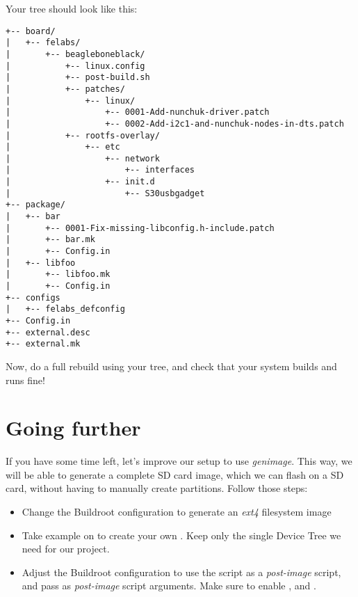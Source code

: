 Your  tree should look like this:

\begin{verbatim}
+-- board/
|   +-- felabs/
|       +-- beagleboneblack/
|           +-- linux.config
|           +-- post-build.sh
|           +-- patches/
|               +-- linux/
|                   +-- 0001-Add-nunchuk-driver.patch
|                   +-- 0002-Add-i2c1-and-nunchuk-nodes-in-dts.patch
|           +-- rootfs-overlay/
|               +-- etc
|                   +-- network
|                       +-- interfaces
|                   +-- init.d
|                       +-- S30usbgadget
+-- package/
|   +-- bar
|       +-- 0001-Fix-missing-libconfig.h-include.patch
|       +-- bar.mk
|       +-- Config.in
|   +-- libfoo
|       +-- libfoo.mk
|       +-- Config.in
+-- configs
|   +-- felabs_defconfig
+-- Config.in
+-- external.desc
+-- external.mk
\end{verbatim}

Now, do a full rebuild using your  tree, and check
that your system builds and runs fine!

\section{Going further}

If you have some time left, let's improve our setup to use {\em
  genimage}. This way, we will be able to generate a complete SD card
image, which we can flash on a SD card, without having to manually
create partitions. Follow those steps:

\begin{itemize}

\item Change the Buildroot configuration to generate an {\em ext4}
  filesystem image

\item Take example on  to create
  your own . Keep only
  the single Device Tree we need for our project.

\item Adjust the Buildroot configuration to use the
   script as a {\em post-image}
  script, and pass 
  as {\em post-image} script arguments. Make sure to enable
  , 
  and .

\end{itemize}
